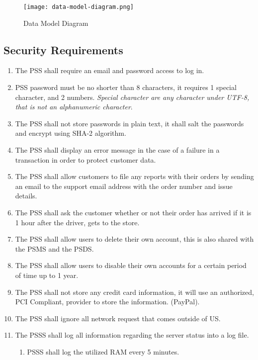 \begin{figure}[!htbp]
    \centering
    \texttt{[image: data-model-diagram.png]}
    \caption{Data Model Diagram}
    \label{fig:data-model-diagram}
\end{figure}
\FloatBarrier
\pagebreak
\subsection{Security Requirements}
\begin{enumerate}[label=SEC-\arabic*]
    \item The PSS shall require an email and password access to log in.
    \item PSS password must be no shorter than 8 characters, it requires
    1 special character, and 2 numbers. \textit{Special character are 
    any character under UTF-8, that is not an alphanumeric character}.
    \item The PSS shall not store passwords in plain text, it shall salt the 
    passwords and encrypt using SHA-2 algorithm.
    \item The PSS shall display an error message in the case of a failure in a 
    transaction in order to protect customer data.
    \item The PSS shall allow customers to file any reports with their orders 
    by sending an email to the support email address with the order number and 
    issue details.
    \item The PSS shall ask the customer whether or not their order has arrived 
    if it is 1 hour after the driver, gets to the store.
    \item The PSS shall allow users to delete their own account, this is also 
    shared with the PSMS and the PSDS.
    \item The PSS shall allow users to disable their own accounts for a certain 
    period of time up to 1 year.
    \item The PSS shall not store any credit card information, it will use an 
    authorized, PCI Compliant, provider to store the information. (PayPal).
    \item The PSS shall ignore all network request that comes outside of US.
    \item The PSSS shall log all information regarding the server status 
    into a log file.
    \begin{enumerate}[label=SEC-11.\arabic*]
        \item PSSS shall log the utilized RAM every 5 minutes. 

\end{enumerate}
\end{enumerate}
